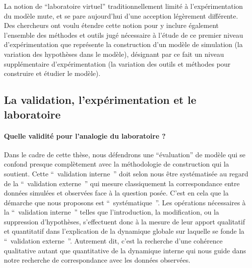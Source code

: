 La notion de \enquote{laboratoire virtuel} traditionnellement limité à l'expérimentation du modèle mute, et se pare aujourd'hui d'une acception légèrement différente. Des chercheurs \autocite{Schmitt2014} \autocite{Amblard2003} ont voulu étendre cette notion pour y inclure également l'ensemble des méthodes et outils jugé nécessaire à l'étude de ce premier niveau d'expérimentation que représente la construction d'un modèle de simulation (la variation des hypothèses dans le modèle), désignant par ce fait un niveau supplémentaire d’expérimentation (la variation des outils et méthodes pour construire et étudier le modèle). 



\subsection{La validation, l'expérimentation et le laboratoire}

\paragraph{Quelle validité pour l'analogie du laboratoire ?}

Dans le cadre de cette thèse, nous défendrons une \enquote{évaluation} de modèle qui se confond presque complètement avec la méthodologie de construction qui la soutient. Cette \enquote{ validation interne } doit selon nous être systématisée au regard de la \enquote{ validation externe } qui mesure classiquement la correspondance entre données simulées et observées face à la question posée. C’est en cela que la démarche que nous proposons est \enquote{ systématique }. Les opérations nécessaires à la \enquote{ validation interne } telles que l'introduction, la modification, ou la suppression d'hypothèses, s’effectuent donc à la mesure de leur apport qualitatif et quantitatif dans l'explication de la dynamique globale sur laquelle se fonde la \enquote{ validation externe }. Autrement dit, c'est la recherche d'une cohérence qualitative autant que quantitative de la dynamique interne qui nous guide dans notre recherche de correspondance avec les données observées.

